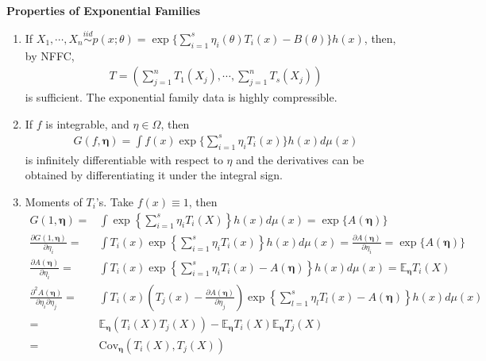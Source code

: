 \begin{note}
    \textbf{Properties of Exponential Families}
    \begin{enumerate}[{(1)}]
        \item If $X_1,\cdots,X_n\overset{iid}{\sim}p(x;\theta)=
        \exp\{\sum_{i=1}^s\eta_i(\theta)T_i(x)-B(\theta)\}h(x)$, then,
        by NFFC, 
        \begin{gather}
            T=(\sum_{j=1}^nT_1(X_j),\cdots,\sum_{j=1}^nT_s(X_j))
        \end{gather}
        is sufficient.
        The exponential family data is highly compressible.
        \item If $f$ is integrable, and $\eta\in\Omega$, then
        \begin{gather}
            G(f,\boldsymbol{\eta})=\int{f(x)\exp\{\sum_{i=1}^s\eta_iT_i(x)\}h(x)d\mu(x)}
        \end{gather}
        is infinitely differentiable with respect to $\eta$ and the derivatives
        can be obtained by differentiating it under the integral sign.
        \item Moments of $T_i$'s. Take $f(x)\equiv 1$, then
        {\scriptsize
        \begin{align}
            G(1,\boldsymbol{\eta})
            =&\int{\exp\left\{ \sum_{i=1}^s\eta_iT_i(X) \right\}}h(x)d\mu(x)=\exp\{A(\boldsymbol{\eta})\}\\
            \frac{\partial{G(1,\boldsymbol{\eta})}}{\partial{\eta_i}}
            =& \int{T_i(x)\exp\left\{\sum_{i=1}^s\eta_iT_i(x)\right\}}h(x)d\mu(x)
            =\frac{\partial{A(\boldsymbol{\eta})}}{\partial{\eta_i}}=\exp\{A(\boldsymbol{\eta})\}\\
            \frac{\partial{A(\boldsymbol{\eta})}}{\partial{\eta_i}}
            =& \int{T_i(x)\exp\left\{ \sum_{i=1}^s\eta_iT_i(x)-A(\boldsymbol{\eta}) \right\}}h(x)d\mu(x)
            =\mathbb{E}_{\boldsymbol{\eta}}T_i(X)\\
            \frac{\partial^2{A(\boldsymbol{\eta})}}{\partial{\eta_i}\partial{\eta_j}}
            =& \int{T_i(x)(T_j(x)-\frac{\partial{A(\boldsymbol{\eta})}}{\partial{\eta_j}})
            \exp\left\{ \sum_{l=1}^s\eta_lT_l(x)-A(\boldsymbol{\eta}) \right\}}h(x)d\mu(x)\\
            =& \mathbb{E}_{\boldsymbol{\eta}}(T_i(X)T_j(X))
            -\mathbb{E}_{\boldsymbol{\eta}}T_i(X)
            \mathbb{E}_{\boldsymbol{\eta}}T_j(X)\\
            =& \mathrm{Cov}_{\boldsymbol{\eta}}(T_i(X),T_j(X))
        \end{align}}
    \end{enumerate}
\end{note}

